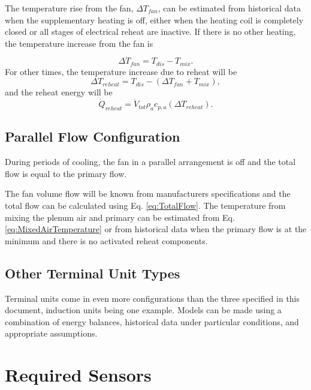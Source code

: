 The temperature rise from the fan, \(\Delta T_{fan}\), can be estimated from
historical data when the supplementary heating is off, either when the heating
coil is completely closed or all stages of electrical reheat are inactive. If
there is no other heating, the temperature increase from the fan is

\begin{equation}
\Delta {T_{fan}} = {T_{dis}} - {T_{mix}}.
\end{equation}
%
For other times, the temperature increase due to reheat will be
%
\begin{equation}
\Delta {T_{reheat}} = {T_{dis}} - \left( {\Delta {T_{fan}} + {T_{mix}}} \right),
\end{equation}
%
and the reheat energy will be
%
\begin{equation}
{\dot Q_{reheat}} = {\dot V_{tot}}{\rho _a}{c_{p,a}}\left( {\Delta {T_{reheat}}} \right).
\end{equation}

\subsection{Parallel Flow Configuration}

During periods of cooling, the fan in a parallel arrangement is off and the
total flow is equal to the primary flow.

The fan volume flow will be known from manufacturers specifications and the
total flow can be calculated using Eq. \eqref{eq:TotalFlow}. The temperature
from mixing the plenum air and primary can be estimated from Eq.
\eqref{eq:MixedAirTemperature} or from historical data when the primary flow is
at the minimum and there is no activated reheat components.

\subsection{Other Terminal Unit Types}

Terminal units come in even more configurations than the three specified
in this document, induction units being one example. Models can be made
using a combination of energy balances, historical data under particular
conditions, and appropriate assumptions.

\section{Required Sensors}

